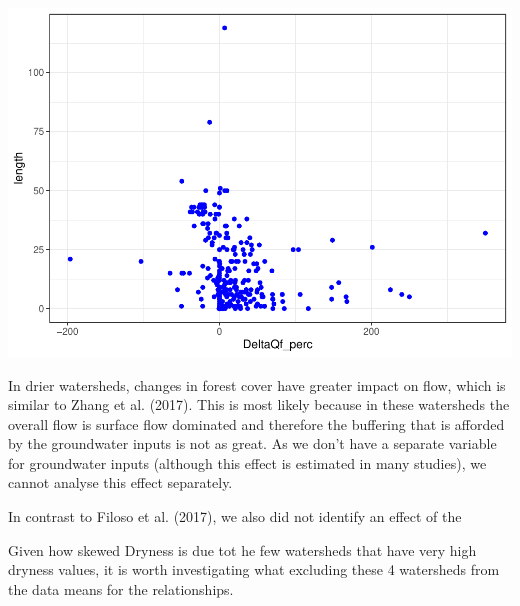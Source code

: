 \documentclass[]{elsarticle} %
\newenvironment{Shaded}{\begin{snugshade}}{\end{snugshade}}
\newcommand{\CommentTok}[1]{\textcolor[rgb]{0.56,0.35,0.01}{\textit{#1}}}
\newcommand{\DataTypeTok}[1]{\textcolor[rgb]{0.13,0.29,0.53}{#1}}
\newcommand{\DecValTok}[1]{\textcolor[rgb]{0.00,0.00,0.81}{#1}}
\newcommand{\KeywordTok}[1]{\textcolor[rgb]{0.13,0.29,0.53}{\textbf{#1}}}
\newcommand{\NormalTok}[1]{#1}
\newcommand{\OperatorTok}[1]{\textcolor[rgb]{0.81,0.36,0.00}{\textbf{#1}}}
\newcommand{\StringTok}[1]{\textcolor[rgb]{0.31,0.60,0.02}{#1}}
\begin{document}
\includegraphics{Forest_and_Water_files/figure-latex/unnamed-chunk-21-1.pdf}

In drier watersheds, changes in forest cover have greater impact on
flow, which is similar to Zhang et al. (2017). This is most likely
because in these watersheds the overall flow is surface flow dominated
and therefore the buffering that is afforded by the groundwater inputs
is not as great. As we don't have a separate variable for groundwater
inputs (although this effect is estimated in many studies), we cannot
analyse this effect separately.

In contrast to Filoso et al. (2017), we also did not identify an effect
of the

Given how skewed Dryness is due tot he few watersheds that have very
high dryness values, it is worth investigating what excluding these 4
watersheds from the data means for the relationships.

\begin{Shaded}
\end{Shaded}
\end{document}
